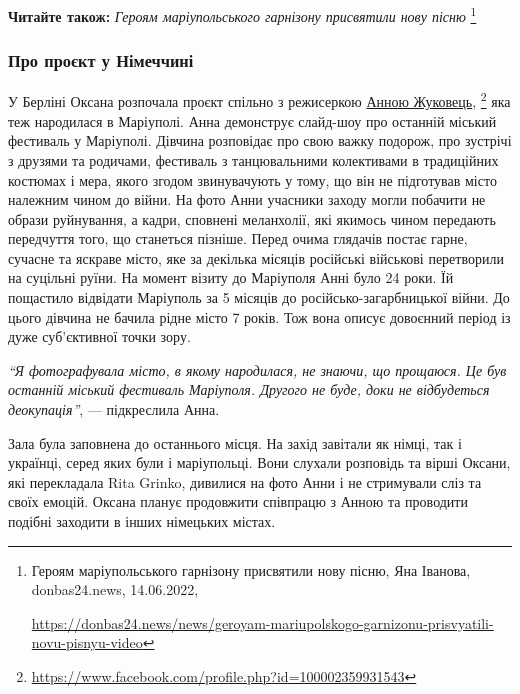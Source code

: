 \textbf{Читайте також:} \emph{Героям маріупольського гарнізону присвятили нову пісню}%
\footnote{Героям маріупольського гарнізону присвятили нову пісню, Яна Іванова, donbas24.news, 14.06.2022, \par%
\url{https://donbas24.news/news/geroyam-mariupolskogo-garnizonu-prisvyatili-novu-pisnyu-video}%
}

\subsubsection{Про проєкт у Німеччині}

У Берліні Оксана розпочала проєкт спільно з режисеркою \href{https://www.facebook.com/profile.php?id=100002359931543}{Анною Жуковець},%
\footnote{\url{https://www.facebook.com/profile.php?id=100002359931543}}
яка теж народилася в Маріуполі. Анна демонструє слайд-шоу про останній міський
фестиваль у Маріуполі. Дівчина розповідає про свою важку подорож, про зустрічі
з друзями та родичами, фестиваль з танцювальними колективами в традиційних
костюмах і мера, якого згодом звинувачують у тому, що він не підготував місто
належним чином до війни. На фото Анни учасники заходу могли побачити не образи
руйнування, а кадри, сповнені меланхолії, які якимось чином передають
передчуття того, що станеться пізніше. Перед очима глядачів постає гарне,
сучасне та яскраве місто, яке за декілька місяців російські військові
перетворили на суцільні руїни. На момент візиту до Маріуполя Анні було 24 роки.
Їй пощастило відвідати Маріуполь за 5 місяців до російсько-загарбницької війни.
До цього дівчина не бачила рідне місто 7 років. Тож вона описує довоєнний
період із дуже суб'єктивної точки зору.

\begin{leftbar}
\emph{\enquote{Я фотографувала місто, в якому народилася, не знаючи, що прощаюся. Це був
останній міський фестиваль Маріуполя. Другого не буде, доки не
відбудеться деокупація}}, — підкреслила Анна.
\end{leftbar}


Зала була заповнена до останнього місця. На захід завітали як німці, так і
українці, серед яких були і маріупольці. Вони слухали розповідь та вірші
Оксани, які перекладала Rita Grinko, дивилися на фото Анни і не стримували сліз
та своїх емоцій. Оксана планує продовжити співпрацю з Анною та проводити
подібні заходити в інших німецьких містах.

